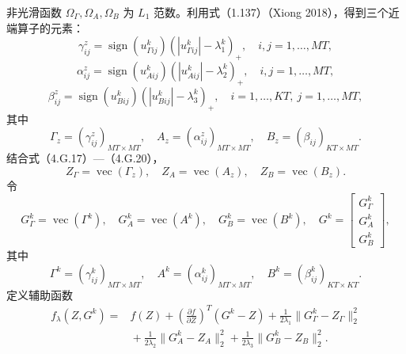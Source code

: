 非光滑函数 $\Omega_\Gamma,\Omega_A,\Omega_B$ 为 $L_1$ 范数。利用式（1.137）（Xiong 2018），得到三个近端算子的元素：
\begin{equation}
\gamma_{ij}^z=\operatorname{sign}(u_{\Gamma ij}^k)(|u_{\Gamma ij}^k|-\lambda_1^k)_+,
\quad i,j=1,\ldots,MT,\tag{4.G.18}
\end{equation}
\begin{equation}
\alpha_{ij}^z=\operatorname{sign}(u_{Aij}^k)(|u_{Aij}^k|-\lambda_2^k)_+,
\quad i,j=1,\ldots,MT,\tag{4.G.19}
\end{equation}
\begin{equation}
\beta_{ij}^z=\operatorname{sign}(u_{Bij}^k)(|u_{Bij}^k|-\lambda_3^k)_+,
\quad i=1,\ldots,KT,\ j=1,\ldots,MT,\tag{4.G.20}
\end{equation}
其中
\[
\Gamma_z=(\gamma_{ij}^z)_{MT\times MT},\quad
A_z=(\alpha_{ij}^z)_{MT\times MT},\quad B_z=(\beta_{ij})_{KT\times MT}.
\]
结合式（4.G.17）—（4.G.20），
\begin{equation}
Z_\Gamma=\operatorname{vec}(\Gamma_z),\quad
Z_A=\operatorname{vec}(A_z),\quad Z_B=\operatorname{vec}(B_z).\tag{4.G.21}
\end{equation}
令
\[
G_\Gamma^k=\operatorname{vec}(\Gamma^k),\quad
G_A^k=\operatorname{vec}(A^k),\quad G_B^k=\operatorname{vec}(B^k),\quad
G^k=\begin{bmatrix}G_\Gamma^k\\G_A^k\\G_B^k\end{bmatrix},
\]
其中
\[
\Gamma^k=(\gamma_{ij}^k)_{MT\times MT},\quad
A^k=(\alpha_{ij}^k)_{MT\times MT},\quad B^k=(\beta_{ij}^k)_{KT\times KT}.
\]
定义辅助函数
\begin{equation}
\begin{aligned}
f_\lambda(Z,G^k)={}&f(Z)
+\left(\frac{\partial f}{\partial Z}\right)^T(G^k-Z)
+\frac1{2\lambda_1}\|G_\Gamma^k-Z_\Gamma\|_2^2\\
&{}+\frac1{2\lambda_2}\|G_A^k-Z_A\|_2^2
+\frac1{2\lambda_3}\|G_B^k-Z_B\|_2^2.
\end{aligned}\tag{4.G.22}
\end{equation}

